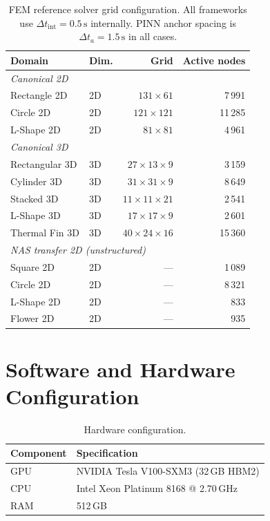 \begin{table}[H]
\centering
\caption{FEM reference solver grid configuration.
All frameworks use $\Delta t_\mathrm{int}=0.5\,\mathrm{s}$ internally.
PINN anchor spacing is $\Delta t_a=1.5\,\mathrm{s}$ in all cases.}
\label{tab:fem_mesh}
\small
\begin{tabular}{llrr}
\toprule
Domain & Dim. & Grid & Active nodes \\
\midrule
\multicolumn{4}{l}{\textit{Canonical 2D}} \\
\midrule
Rectangle 2D  & 2D & $131{\times}61$          & 7\,991  \\
Circle 2D     & 2D & $121{\times}121$         & 11\,285 \\
L-Shape 2D    & 2D & $81{\times}81$           & 4\,961  \\
\midrule
\multicolumn{4}{l}{\textit{Canonical 3D}} \\
\midrule
Rectangular 3D & 3D & $27{\times}13{\times}9$  & 3\,159  \\
Cylinder 3D    & 3D & $31{\times}31{\times}9$  & 8\,649  \\
Stacked 3D     & 3D & $11{\times}11{\times}21$ & 2\,541  \\
L-Shape 3D     & 3D & $17{\times}17{\times}9$  & 2\,601  \\
\midrule
Thermal Fin 3D & 3D & $40{\times}24{\times}16$ & 15\,360 \\
\midrule
\multicolumn{4}{l}{\textit{NAS transfer 2D (unstructured)}} \\
\midrule
Square 2D  & 2D & --- & 1\,089 \\
Circle 2D  & 2D & --- & 8\,321 \\
L-Shape 2D & 2D & --- &   833  \\
Flower 2D  & 2D & --- &   935  \\
\bottomrule
\end{tabular}
\end{table}

\chapter{Software and Hardware Configuration}
\label{app:hardware}

\begin{table}[H]
\centering
\caption{Hardware configuration.}
\label{tab:hardware}
\small
\begin{tabular}{ll}
\toprule
Component & Specification \\
\midrule
GPU & NVIDIA Tesla V100-SXM3 (32\,GB HBM2) \\
CPU & Intel Xeon Platinum 8168 @ 2.70\,GHz \\
RAM & 512\,GB \\
\bottomrule
\end{tabular}
\end{table}

